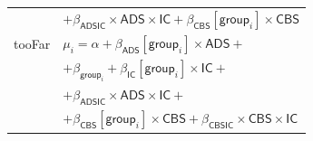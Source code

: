 \documentclass[preprint,12pt]{elsarticle}
\begin{document}
\begin{center}
\begin{tabular}{p{5cm}l}
&  $ + \beta_{\mathsf{ADSIC}}\times \mathsf{ADS} \times \mathsf{IC} + \beta_{\mathsf{CBS}}[\mathsf{group}_i] \times \mathsf{CBS} \nonumber$\\
tooFar & $\mu_i  = \alpha + \beta_{\mathsf{ADS}}[\mathsf{group}_i]\times \mathsf{ADS} + $ \\ & $ +  \beta_{\mathsf{group}_i}  +  \beta_{\mathsf{IC}}[\mathsf{group}_i]\times \mathsf{IC} +$ \\
 & $ + \beta_{\mathsf{ADSIC}}\times \mathsf{ADS} \times \mathsf{IC} + $ \\ & $ +  \beta_{\mathsf{CBS}}[\mathsf{group}_i] \times \mathsf{CBS} + \beta_{\mathsf{CBSIC}}\times
  \mathsf{CBS} \times \mathsf{IC} \nonumber$ 
\end{tabular}
\end{center}

\normalsize 


\footnotesize
\end{document}
